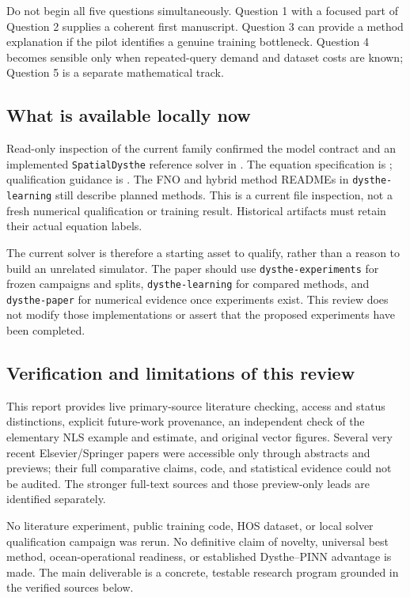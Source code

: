 Do not begin all five questions simultaneously. Question 1 with a focused
part of Question 2 supplies a coherent first manuscript. Question 3 can
provide a method explanation if the pilot identifies a genuine training
bottleneck. Question 4 becomes sensible only when repeated-query demand
and dataset costs are known; Question 5 is a separate mathematical track.

\subsection{What is available locally now}
Read-only inspection of the current family confirmed the model contract
and an implemented \texttt{SpatialDysthe} reference solver in
.
The equation specification is
; qualification guidance is
.
The FNO and hybrid method READMEs in \texttt{dysthe-learning} still describe
planned methods. This is a current file inspection, not a fresh numerical
qualification or training result. Historical artifacts must retain their
actual equation labels.

The current solver is therefore a starting asset to qualify, rather than
a reason to build an unrelated simulator. The paper should use
\texttt{dysthe-experiments} for frozen campaigns and splits,
\texttt{dysthe-learning} for compared methods, and
\texttt{dysthe-paper} for numerical evidence once experiments exist.
This review does not modify those implementations or assert that the
proposed experiments have been completed.

\subsection{Verification and limitations of this review}
This report provides live primary-source literature checking, access and
status distinctions, explicit future-work provenance, an independent
check of the elementary NLS example and estimate, and original vector
figures. Several very recent Elsevier/Springer papers were accessible
only through abstracts and previews; their full comparative claims,
code, and statistical evidence could not be audited. The stronger
full-text sources and those preview-only leads are identified separately.

No literature experiment, public training code, HOS dataset, or local
solver qualification campaign was rerun. No definitive claim of novelty,
universal best method, ocean-operational readiness, or established
Dysthe--PINN advantage is made. The main deliverable is a concrete,
testable research program grounded in the verified sources below.
